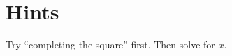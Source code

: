 \chapter{Hints}
\label{chapter:Hints}
\thispagestyle{empty}

\begin{hint*}\label{hint:thm:MonicQuadratic}
Try ``completing the square'' first. Then solve for $x$.
\end{hint*}
